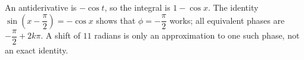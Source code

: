 An antiderivative is $-\cos t$, so the integral is $1-\cos x$. The identity $\sin (x - \dfrac{\pi}{2}) = - \cos x$ shows that $\boxed{\phi = - \dfrac{\pi}{2}}$ works; all equivalent phases are $- \dfrac{\pi}{2} + 2 k \pi$. A shift of $11$ radians is only an approximation to one such phase, not an exact identity.
